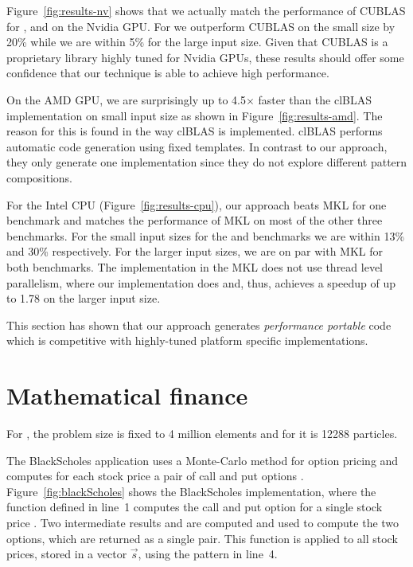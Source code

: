 Figure~\ref{fig:results-nv} shows that we actually match the performance of CUBLAS for ,  and  on the Nvidia GPU.
For  we outperform CUBLAS on the small size by 20\% while we are within 5\% for the large input size.
Given that CUBLAS is a proprietary library highly tuned for Nvidia GPUs, these results should offer some confidence that our technique is able to achieve high performance.

On the AMD GPU, we are surprisingly up to 4.5$\times$ faster than the clBLAS implementation on  small input size as shown in Figure~\ref{fig:results-amd}.
The reason for this is found in the way clBLAS is implemented.
clBLAS performs automatic code generation using fixed templates.
In contrast to our approach, they only generate one implementation since they do not explore different pattern compositions.

For the Intel CPU (Figure~\ref{fig:results-cpu}), our approach beats MKL for one benchmark and matches the performance of MKL on most of the other three benchmarks.
For the small input sizes for the  and  benchmarks we are within 13\% and 30\% respectively.
For the larger input sizes, we are on par with MKL for both benchmarks.
The  implementation in the MKL does not use thread level parallelism, where our implementation does and, thus, achieves a speedup of up to 1.78 on the larger input size.


This section has shown that our approach generates \emph{performance portable} code which is competitive with highly-tuned platform specific implementations.










\section{Mathematical finance}

For , the problem size is fixed to 4 million elements and for  it is 12288 particles.

The BlackScholes application uses a Monte-Carlo method for option pricing and computes for each stock price  a pair of call and put options .
Figure~\ref{fig:blackScholes} shows the BlackScholes implementation, where the function defined in line~1 computes the call and put option for a single stock price .
Two intermediate results  and  are computed and used to compute the two options, which are returned as a single pair.
This  function is applied to all stock prices, stored in a vector $\vec{s}$, using the  pattern in line~4.


